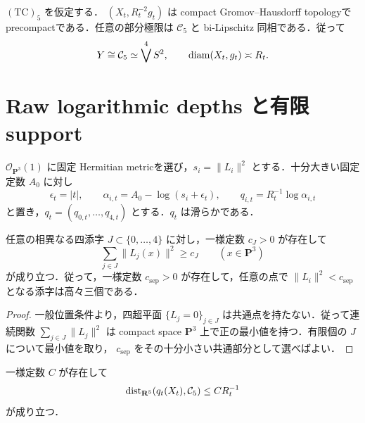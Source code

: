 \documentclass[a4paper,11pt]{ltjsarticle}
\numberwithin{equation}{section}
\theoremstyle{plain}
\theoremstyle{definition}
\theoremstyle{remark}
\newcommand{\PP}{\mathbf P}\newcommand{\CC}{\mathbf C}\newcommand{\RR}{\mathbf R}\newcommand{\ZZ}{\mathbf Z}\newcommand{\NN}{\mathbf N}
\newcommand{\Cfive}{\mathcal C_5}\newcommand{\dsq}{d_{\square}}\newcommand{\Lt}{L_t}\newcommand{\Rt}{R_t}
\begin{document}
\begin{corollary}\label{coarse:cor:coarse-GH}
$\mathrm{(TC)}_5$ を仮定する．
$(X_t,R_t^{-2}g_t)$ は compact Gromov--Hausdorff topologyで precompactである．任意の部分極限は $\Cfive$ と bi-Lipschitz 同相である．従って
\[
 Y\cong\Cfive\simeq\bigvee^4S^2,
 \qquad \diam(X_t,g_t)\asymp R_t.
\]
\end{corollary}

\section{Raw logarithmic depths と有限 support}\label{coarse:sec:raw}

$\mathcal O_{\PP^3}(1)$ に固定 Hermitian metricを選び，$s_i=\|L_i\|^2$ とする．十分大きい固定定数 $A_0$ に対し
\begin{equation}\label{coarse:eq:raw-definition}
 \epsilon_t=|t|,
 \qquad \alpha_{i,t}=A_0-\log(s_i+\epsilon_t),
 \qquad q_{i,t}=R_t^{-1}\log\alpha_{i,t}
\end{equation}
と置き，$q_t=(q_{0,t},\ldots,q_{4,t})$ とする．$q_t$ は滑らかである．

\begin{lemma}\label{coarse:lem:four-plane-separation}
任意の相異なる四添字 $J\subset\{0,\ldots,4\}$ に対し，一様定数 $c_J>0$ が存在して
\[
 \sum_{j\in J}\|L_j(x)\|^2\ge c_J
 \qquad (x\in\PP^3)
\]
が成り立つ．従って，一様定数 $c_{\mathrm{sep}}>0$ が存在して，任意の点で
$\|L_i\|^2<c_{\mathrm{sep}}$ となる添字は高々三個である．
\end{lemma}

\begin{proof}
一般位置条件より，四超平面 $\{L_j=0\}_{j\in J}$ は共通点を持たない．従って連続関数
$\sum_{j\in J}\|L_j\|^2$ は compact space $\PP^3$ 上で正の最小値を持つ．有限個の $J$ について最小値を取り，
$c_{\mathrm{sep}}$ をその十分小さい共通部分として選べばよい．
\end{proof}

\begin{lemma}[有限 support]\label{coarse:lem:raw-near-C5}
一様定数 $C$ が存在して
\begin{equation}\label{coarse:eq:raw-near-C5}
 \dist_{\RR^5}(q_t(X_t),\Cfive)\le CR_t^{-1}
\end{equation}
が成り立つ．
\end{lemma}
\end{document}
